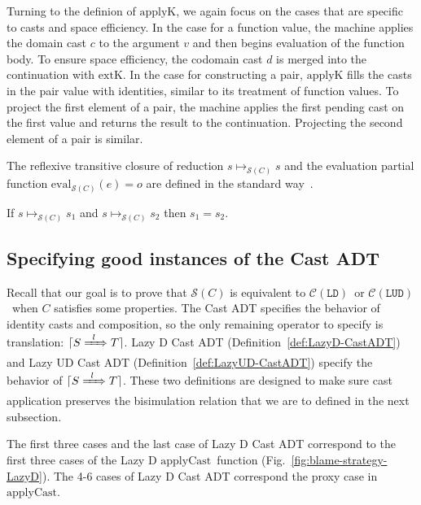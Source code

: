 \documentclass[runningheads]{llncs}
\newcommand{\CMachine}[1]{\ensuremath{\mathcal{C}(#1)}}
\newcommand{\LDMachine}{\CMachine{\BLD}}
\newcommand{\LUDMachine}{\CMachine{\BLUD}}
\newcommand{\SMachine}[1]{\ensuremath{\mathcal{S}(#1)}}
\newcommand{\ccast}[3]{#1 \xRightarrow[]{\enskip #2 \enskip} #3}
\newcommand{\BLD}[0]{\ensuremath{\mathtt{LD}}}
\newcommand{\BLUD}[0]{\ensuremath{\mathtt{LUD}}}
\newcommand{\translate}[1]{\ensuremath{\lceil#1\rceil}}
\newcommand{\applyContName}[0]{\ensuremath{\mathrm{applyK}}}
\newcommand{\applyCastName}[0]{\ensuremath{\mathrm{applyCast}}}
\newcommand{\reducetoS}[3]{\ensuremath{#2 \longmapsto_{\SMachine{#1}} #3}}
\newcommand{\evaltoS}[3]{\ensuremath{\mathrm{eval}_{\SMachine{#1}}(#2)=#3}}
\begin{document}
Turning to the definion of $\applyContName{}$, we again focus on the
cases that are specific to casts and space efficiency.  In the case
for a function value, the machine applies the domain cast $c$ to the
argument $v$ and then begins evaluation of the function body. To
ensure space efficiency, the codomain cast $d$ is merged into the
continuation with $\mathrm{extK}$.
%
In the case for constructing a pair, $\applyContName$ fills the casts
in the pair value with identities, similar to its treatment of
function values.
%
To project the first element of a pair, the machine applies the first
pending cast on the first value and returns the result to the
continuation.
%
Projecting the second element of a pair is similar.

The reflexive transitive closure of reduction $\reducetoS{C}{s}{s}$
and the evaluation partial function $\evaltoS{C}{e}{o}$ are defined in
the standard way~\citep{felleisen03:_pllc}.

\begin{proposition}[\SMachine{C} is deterministic]
	\label{prop:SEMachine-deterministic}
	If $\reducetoS{C}{s}{s_1}$ and $\reducetoS{C}{s}{s_2}$ 
	then $s_1 = s_2$.
\end{proposition}

\subsection{Specifying good instances of the Cast ADT} \label{sec:good-cast-adt}

Recall that our goal is to prove that \SMachine{C} is equivalent to
\LDMachine\ or \LUDMachine\ when $C$ satisfies some properties. The
Cast ADT specifies the behavior of identity casts and composition, so
the only remaining operator to specify is translation:
$\translate{\ccast{S}{l}{T}}$.
%
Lazy D Cast ADT (Definition~\ref{def:LazyD-CastADT}) and Lazy UD Cast ADT 
(Definition~\ref{def:LazyUD-CastADT}) specify the behavior 
of \translate{\ccast{S}{l}{T}}. These two definitions are designed to
make sure cast application preserves the bisimulation relation that we
are to defined in the next subsection.


The first three cases and the last case of Lazy D Cast ADT correspond
to the first three cases of the Lazy D \applyCastName\ function
(Fig.~\ref{fig:blame-strategy-LazyD}).
The 4-6 cases of Lazy D Cast ADT correspond the proxy case in \applyCastName.
\end{document}
